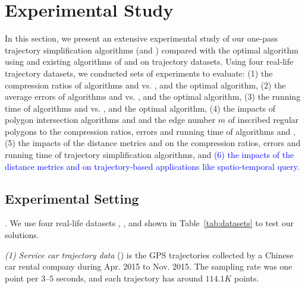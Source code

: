 \section{Experimental Study} %
\label{sec-exp}


In this section, we present an extensive experimental study of our one-pass trajectory simplification algorithms (\cist and \cista) compared with the optimal algorithm using \sed and existing algorithms of \dps and \squishe on trajectory datasets.
%
Using four real-life trajectory datasets, we conducted sets of experiments to evaluate:
(1) the compression ratios of algorithms \cist and \cista vs. \dps, \squishe and the optimal algorithm,
(2) the average errors of algorithms \cist and \cista vs. \dps, \squishe and the optimal algorithm,
(3) the running time of algorithms \cist and \cista vs. \dps, \squishe and the optimal algorithm,
(4) the impacts of polygon intersection algorithms \rpia and \cpia and the edge number $m$ of inscribed regular polygons to the compression ratios, errors and running time of algorithms \cist and \cista,
(5) the impacts of the distance metrics \ped and \sed on the compression ratios, errors and running time of trajectory simplification algorithms, and
\textcolor{blue}{(6) the impacts of the distance metrics \ped and \sed on trajectory-based applications like spatio-temporal query.}


\subsection{Experimental Setting}

.
We use four real-life datasets \sercar, \geolife, \mopsi and \pricar shown in Table~\ref{tab:datasets} to test our solutions.


\vspace{0.5ex}
\ni \emph{(1) Service car trajectory data} (\sercar) is the GPS trajectories collected by a Chinese car rental company during Apr. 2015 to Nov. 2015. The sampling rate was one point per $3$--$5$ seconds, and
each trajectory has around $114.1K$ points.

